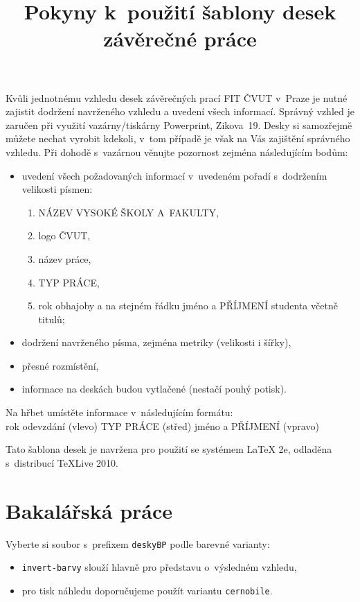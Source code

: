 \documentclass[a4paper]{article}
\title{Pokyny k~použití šablony desek závěrečné práce}
\author{}
\date{}
\begin{document}
\maketitle

\thispagestyle{empty}

Kvůli jednotnému vzhledu desek závěrečných prací FIT ČVUT v~Praze je nutné zajistit dodržení navrženého vzhledu a uvedení všech informací. Správný vzhled je zaručen při využití vazárny/tiskárny Powerprint, Zikova~19. Desky si samozřejmě můžete nechat vyrobit kdekoli, v~tom případě je však na Vás zajištění správného vzhledu. Při dohodě s~vazárnou věnujte pozornost zejména následujícím bodům:
\begin{itemize}
	\item uvedení všech požadovaných informací v~uvedeném pořadí s~dodržením velikosti písmen:
	\begin{enumerate}
		\item NÁZEV VYSOKÉ ŠKOLY A~FAKULTY,
		\item logo ČVUT,
		\item název práce,
		\item TYP PRÁCE,
		\item rok obhajoby a na stejném řádku jméno a PŘÍJMENÍ studenta včetně titulů;
	\end{enumerate}
	\item dodržení navrženého písma, zejména metriky (velikosti i šířky),
	\item přesné rozmístění,
	\item informace na deskách budou vytlačené (nestačí pouhý potisk).
\end{itemize}

Na hřbet umístěte informace v~následujícím formátu:\\
rok odevzdání (vlevo) \hfill TYP PRÁCE (střed) \hfill jméno a PŘÍJMENÍ (vpravo)

Tato šablona desek je navržena pro použití se systémem \LaTeX{} 2e, odladěna s~distribucí TeXLive 2010.

\section*{Bakalářská práce}

Vyberte si soubor s~prefixem \verb|deskyBP| podle barevné varianty:
\begin{itemize}
	\item \verb|invert-barvy| slouží hlavně pro představu o~výsledném vzhledu,
	\item pro tisk náhledu doporučujeme použít variantu \verb|cernobile|.
\end{itemize}
\end{document}
